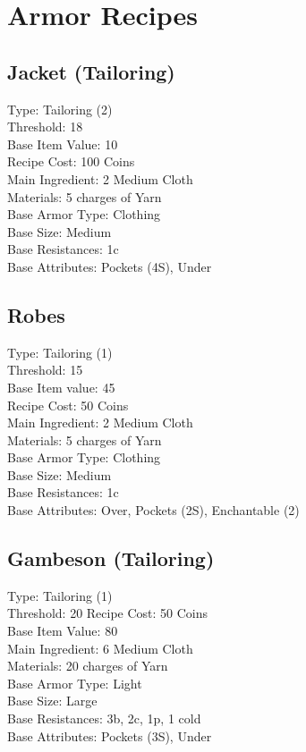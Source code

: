 \section{Armor Recipes}\label{sec:armorRecipes}
\subsection{Jacket (Tailoring)}\label{recipe:jacketTailoring}
Type: Tailoring (2)\\
Threshold: 18\\
Base Item Value: 10\\
Recipe Cost: 100 Coins\\
Main Ingredient: 2 Medium Cloth\\
Materials: 5 charges of Yarn\\
Base Armor Type: Clothing\\
Base Size: Medium\\
Base Resistances: 1c\\
Base Attributes: Pockets (4S), Under\\

\subsection{Robes}\label{recipe:robes}
Type: Tailoring (1)\\
Threshold: 15\\
Base Item value: 45\\
Recipe Cost: 50 Coins\\
Main Ingredient: 2 Medium Cloth\\
Materials: 5 charges of Yarn\\
Base Armor Type: Clothing\\
Base Size: Medium\\
Base Resistances: 1c\\
Base Attributes: Over, Pockets (2S), Enchantable (2)\\

\subsection{Gambeson (Tailoring)}\label{recipe:gambesonTailoring}
Type: Tailoring (1)\\
Threshold: 20
Recipe Cost: 50 Coins\\
Base Item Value: 80\\
Main Ingredient: 6 Medium Cloth\\
Materials: 20 charges of Yarn\\
Base Armor Type: Light\\
Base Size: Large \\
Base Resistances: 3b, 2c, 1p, 1 cold\\
Base Attributes: Pockets (3S), Under\\

